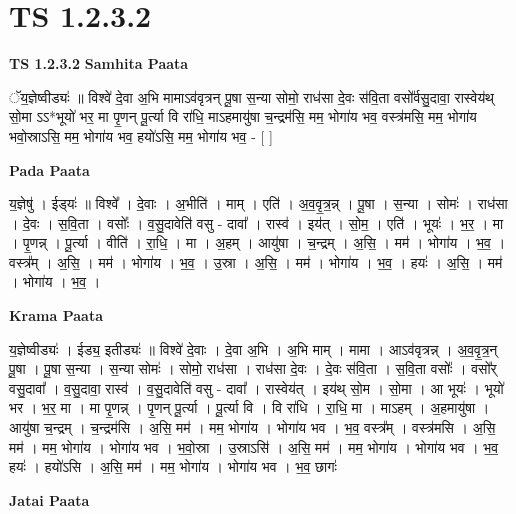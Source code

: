 \documentclass[17pt]{extarticle}
\begin{document}
\section*{ TS 1.2.3.2 }

\textbf{TS 1.2.3.2 } \newline
\textbf{Samhita Paata} \newline

ॅय॒ज्ञेष्वीड्यः॑ ॥ विश्वे॑ दे॒वा अ॒भि मामाऽव॑वृत्रन् पू॒षा स॒न्या सोमो॒ राध॑सा दे॒वः स॑वि॒ता वसो᳚र्वसु॒दावा॒ रास्वेय॑थ् सो॒मा ऽऽ*भूयो॑ भर॒ मा पृ॒णन् पू॒र्त्या वि रा॑धि॒ माऽहमायु॑षा च॒न्द्रम॑सि॒ मम॒ भोगा॑य भव॒ वस्त्र॑मसि॒ मम॒ भोगा॑य भवो॒स्राऽसि॒ मम॒ भोगा॑य भव॒ हयो॑ऽसि॒ मम॒ भोगा॑य भव॒ - [ ] \newline

\textbf{Pada Paata} \newline

य॒ज्ञेषु॑ । ईड्‍यः॑ ॥ विश्वे᳚ । दे॒वाः । अ॒भीति॑ । माम् । एति॑ । अ॒व॒वृ॒त्र॒न्न् । पू॒षा । स॒न्या । सोमः॑ । राध॑सा । दे॒वः । स॒वि॒ता । वसोः᳚ । व॒सु॒दावेति॑ वसु - दावा᳚ । रास्व॑ । इय॑त् । सो॒म॒ । एति॑ । भूयः॑ । भ॒र॒ । मा । पृ॒णन्न् । पू॒र्त्या । वीति॑ । रा॒धि॒ । मा । अ॒हम् । आयु॑षा । च॒न्द्रम् । अ॒सि॒ । मम॑ । भोगा॑य । भ॒व॒ । वस्त्र᳚म् । अ॒सि॒ । मम॑ । भोगा॑य । भ॒व॒ । उ॒स्रा । अ॒सि॒ । मम॑ । भोगा॑य । भ॒व॒ । हयः॑ । अ॒सि॒ । मम॑ । भोगा॑य । भ॒व॒ ।  \newline


\textbf{Krama Paata} \newline

य॒ज्ञेष्वीड्यः॑ । ईड्य॒ इतीड्यः॑ ॥ विश्वे॑ दे॒वाः । दे॒वा अ॒भि । अ॒भि माम् । मामा । आऽव॑वृत्रन्न् । अ॒व॒वृ॒त्र॒न् पू॒षा । पू॒षा स॒न्या । स॒न्या सोमः॑ । सोमो॒ राध॑सा । राध॑सा दे॒वः । दे॒वः स॑वि॒ता । स॒वि॒ता वसोः᳚ । वसो᳚र् वसु॒दावा᳚ । व॒सु॒दावा॒ रास्व॑ । व॒सु॒दावेति॑ वसु - दावा᳚ । रास्वेय॑त् । इय॑थ् सो॒म । सो॒मा । आ भूयः॑ । भूयो॑ भर । भ॒र॒ मा । मा पृ॒णन्न् । पृ॒णन् पू॒र्त्या । पू॒र्त्या वि । वि रा॑धि । रा॒धि॒ मा । माऽहम् । अ॒हमायु॑षा । आयु॑षा च॒न्द्रम् । च॒न्द्रम॑सि । अ॒सि॒ मम॑ । मम॒ भोगा॑य । भोगा॑य भव । भ॒व॒ वस्त्र᳚म् । वस्त्र॑मसि । अ॒सि॒ मम॑ । मम॒ भोगा॑य । भोगा॑य भव । भ॒वो॒स्रा । उ॒स्राऽसि॑ । अ॒सि॒ मम॑ । मम॒ भोगा॑य । भोगा॑य भव । भ॒व॒ हयः॑ । हयो॑ऽसि । अ॒सि॒ मम॑ । मम॒ भोगा॑य । भोगा॑य भव । भ॒व॒ छागः॑ \newline

\textbf{Jatai Paata} \newline
\end{document}

